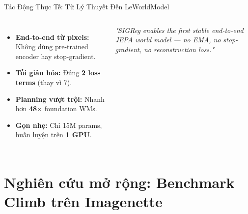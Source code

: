 \documentclass[aspectratio=169,9pt]{beamer}
\newcommand{\cmark}{\ding{51}}
\begin{document}
\begin{frame}{Tác Động Thực Tế: Từ Lý Thuyết Đến LeWorldModel}
\begin{columns}[c]
\vspace{0.3cm}
\begin{itemize}\small
  \setlength{\itemsep}{0.6em}
  \item[\textcolor{mgood}{\textbf{\cmark}}] \textbf{End-to-end từ pixels:} Không dùng pre-trained encoder hay stop-gradient.
  \item[\textcolor{mgood}{\textbf{\cmark}}] \textbf{Tối giản hóa:} Đúng \textbf{2 loss terms} (thay vì 7).
  \item[\textcolor{mgood}{\textbf{\cmark}}] \textbf{Planning vượt trội:} Nhanh hơn \textbf{48$\times$} foundation WMs.
  \item[\textcolor{mgood}{\textbf{\cmark}}] \textbf{Gọn nhẹ:} Chỉ 15M params, huấn luyện trên \textbf{1 GPU}.
\end{itemize}

\vspace{0.5cm}
\begin{accentbox}
\centering\small\itshape
"SIGReg enables the first stable end-to-end JEPA world model — no EMA, no stop-gradient, no reconstruction loss."
\end{accentbox}

\end{columns}

\end{frame}
\fi


\section{Nghiên cứu mở rộng: Benchmark Climb trên Imagenette}
\end{document}
